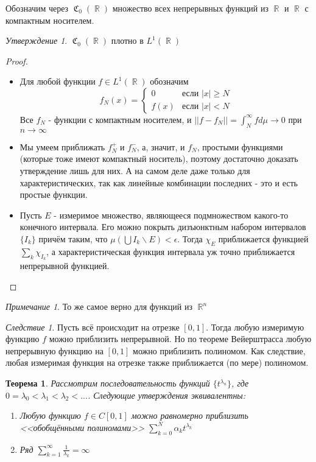\documentclass[a4paper]{article}
\theoremstyle{indented}
\newtheorem{theorem}{Теорема}
\theoremstyle{definition}
\theoremstyle{remark}
\newtheorem{remark}{Примечание}
\newtheorem{cons}{Следствие}
\newtheorem{stat}{Утверждение}
\DeclareMathOperator{\ra}{\rightarrow}
\DeclareMathOperator{\RR}{\mathbb{R}}
\DeclareMathOperator{\GC}{\mathfrak{C}}
\begin{document}
Обозначим через $\GC_0(\RR)$ множество всех непрерывных функций из $\RR$ и $\RR$ с компактным носителем.
\begin{stat}
$\GC_0(\RR)$ плотно в $L^1(\RR)$
\end{stat}
\begin{proof}
\
\begin{itemize}
    \item Для любой функции $f \in L^1(\RR)$ обозначим $$f_N(x) = \begin{cases} 0 &\mbox{если } |x|\geq N \\ 
f(x) & \mbox{если } |x|<N \end{cases}$$ Все $f_N$ - функции с компактным носителем, и $||f-f_N|| = \int_N^{\infty} f d \mu \ra 0$ при $n \ra \infty$
\item Мы умеем приближать $f_N^+$ и $f_N^-$, а, значит, и $f_N$, простыми функциями (которые тоже имеют компактный носитель), поэтому достаточно доказать утверждение лишь для них. А на самом деле даже только для характеристических, так как линейные комбинации последних - это и есть простые функции.
\item Пусть $E$ - измеримое множество, являющееся подмножеством какого-то конечного интервала. Его можно покрыть дизъюнктным набором интервалов $\{I_k\}$ причём таким, что $\mu(\bigcup I_k \backslash E) < \epsilon$. Тогда $\chi_E$ приближается функцией $\sum_k \chi_{I_k}$, а характеристическая функция интервала уж точно приближается непрерывной функцией. 
\end{itemize}
\end{proof}
\begin{remark}
То же самое верно для функций из $\RR^n$
\end{remark}
\begin{cons}
Пусть всё происходит на отрезке $[0, 1]$. Тогда любую измеримую функцию $f$ можно приблизить непрерывной. Но по теореме Вейерштрасса любую непрерывную функцию на $[0, 1]$ можно приблизить полиномом. Как следствие, любая измеримая функция на отрезке также приближается (по мере) полиномом.
\end{cons}
\begin{theorem} 
Рассмотрим последовательность функций $\{t^{\lambda_n}\}$, где $0=\lambda_0<\lambda_1 < \lambda_2 <...$. Следующие утверждения эквивалентны:
\begin{enumerate}
    \item Любую функцию $f \in C[0, 1]$ можно равномерно приблизить <<обобщёнными полиномами>> $\sum_{k=0}^N \alpha_k t^{\lambda_k}$
    \item Ряд $\sum_{k=1}^{\infty} \frac{1}{\lambda_k}=\infty$
\end{enumerate} 
\end{theorem}
\end{document}
